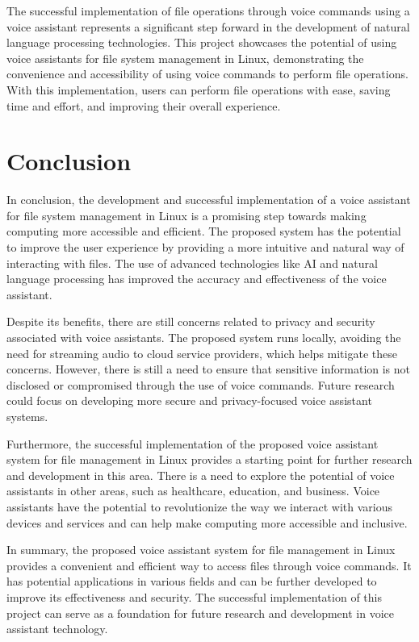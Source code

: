 \documentclass[conference]{IEEEtran}
\begin{document}
The successful implementation of file operations through voice commands using a voice assistant represents a significant step forward in the development of natural language processing technologies. This project showcases the potential of using voice assistants for file system management in Linux, demonstrating the convenience and accessibility of using voice commands to perform file operations. With this implementation, users can perform file operations with ease, saving time and effort, and improving their overall experience.

\section{Conclusion}
In conclusion, the development and successful implementation of a voice assistant for file system management in Linux is a promising step towards making computing more accessible and efficient. The proposed system has the potential to improve the user experience by providing a more intuitive and natural way of interacting with files. The use of advanced technologies like AI and natural language processing has improved the accuracy and effectiveness of the voice assistant.

\par Despite its benefits, there are still concerns related to privacy and security associated with voice assistants. The proposed system runs locally, avoiding the need for streaming audio to cloud service providers, which helps mitigate these concerns. However, there is still a need to ensure that sensitive information is not disclosed or compromised through the use of voice commands. Future research could focus on developing more secure and privacy-focused voice assistant systems.

\par Furthermore, the successful implementation of the proposed voice assistant system for file management in Linux provides a starting point for further research and development in this area. There is a need to explore the potential of voice assistants in other areas, such as healthcare, education, and business. Voice assistants have the potential to revolutionize the way we interact with various devices and services and can help make computing more accessible and inclusive.

\par In summary, the proposed voice assistant system for file management in Linux provides a convenient and efficient way to access files through voice commands. It has potential applications in various fields and can be further developed to improve its effectiveness and security. The successful implementation of this project can serve as a foundation for future research and development in voice assistant technology.
\end{document}

